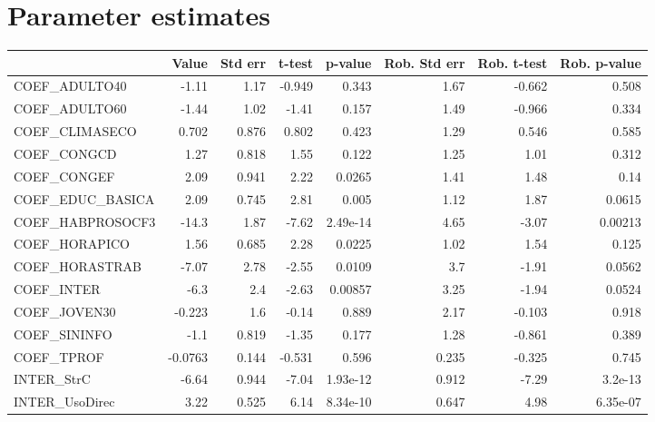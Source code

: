 \section{Parameter estimates}
\begin{tabular}{lrrrrrrr}
\toprule
{} &   Value &  Std err &  t-test &  p-value &  Rob. Std err &  Rob. t-test &  Rob. p-value \\
\midrule
COEF\_ADULTO40       &   -1.11 &     1.17 &  -0.949 &    0.343 &          1.67 &       -0.662 &         0.508 \\
COEF\_ADULTO60       &   -1.44 &     1.02 &   -1.41 &    0.157 &          1.49 &       -0.966 &         0.334 \\
COEF\_CLIMASECO      &   0.702 &    0.876 &   0.802 &    0.423 &          1.29 &        0.546 &         0.585 \\
COEF\_CONGCD         &    1.27 &    0.818 &    1.55 &    0.122 &          1.25 &         1.01 &         0.312 \\
COEF\_CONGEF         &    2.09 &    0.941 &    2.22 &   0.0265 &          1.41 &         1.48 &          0.14 \\
COEF\_EDUC\_BASICA    &    2.09 &    0.745 &    2.81 &    0.005 &          1.12 &         1.87 &        0.0615 \\
COEF\_HABPROSOCF3    &   -14.3 &     1.87 &   -7.62 & 2.49e-14 &          4.65 &        -3.07 &       0.00213 \\
COEF\_HORAPICO       &    1.56 &    0.685 &    2.28 &   0.0225 &          1.02 &         1.54 &         0.125 \\
COEF\_HORASTRAB      &   -7.07 &     2.78 &   -2.55 &   0.0109 &           3.7 &        -1.91 &        0.0562 \\
COEF\_INTER          &    -6.3 &      2.4 &   -2.63 &  0.00857 &          3.25 &        -1.94 &        0.0524 \\
COEF\_JOVEN30        &  -0.223 &      1.6 &   -0.14 &    0.889 &          2.17 &       -0.103 &         0.918 \\
COEF\_SININFO        &    -1.1 &    0.819 &   -1.35 &    0.177 &          1.28 &       -0.861 &         0.389 \\
COEF\_TPROF          & -0.0763 &    0.144 &  -0.531 &    0.596 &         0.235 &       -0.325 &         0.745 \\
INTER\_StrC          &   -6.64 &    0.944 &   -7.04 & 1.93e-12 &         0.912 &        -7.29 &       3.2e-13 \\
INTER\_UsoDirec      &    3.22 &    0.525 &    6.14 & 8.34e-10 &         0.647 &         4.98 &      6.35e-07 \\

\end{tabular}
